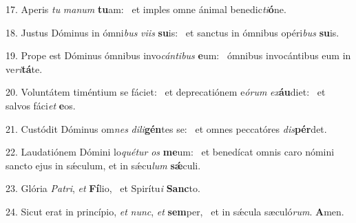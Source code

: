 17. Aperis \textit{tu} \textit{ma}\textit{num} \textbf{tu}am: \ast\  et imples omne ánimal benedic\textit{ti}\textbf{ó}ne.\

18. Justus Dóminus in ómni\textit{bus} \textit{vi}\textit{is} \textbf{su}is: \ast\  et sanctus in ómnibus opéri\textit{bus} \textbf{su}is.\

19. Prope est Dóminus ómnibus invo\textit{cán}\textit{ti}\textit{bus} \textbf{e}um: \ast\  ómnibus invocántibus eum in ve\textit{ri}\textbf{tá}te.\

20. Voluntátem timéntium se fáciet: \dag\  et deprecatiónem e\textit{ó}\textit{rum} \textit{ex}\textbf{áu}diet: \ast\  et salvos fáci\textit{et} \textbf{e}os.\

21. Custódit Dóminus om\textit{nes} \textit{di}\textit{li}\textbf{gén}tes se: \ast\  et omnes peccatóres \textit{dis}\textbf{pér}det.\

22. Laudatiónem Dómini lo\textit{qué}\textit{tur} \textit{os} \textbf{me}um: \ast\  et benedícat omnis caro nómini sancto ejus in sǽculum, et in sǽcu\textit{lum} \textbf{sǽ}culi.\

23. Glória \textit{Pa}\textit{tri}, \textit{et} \textbf{Fí}lio, \ast\  et Spirítu\textit{i} \textbf{Sanc}to.\

24. Sicut erat in princípio, \textit{et} \textit{nunc}, \textit{et} \textbf{sem}per, \ast\  et in sǽcula sæculó\textit{rum}. \textbf{A}men.\

